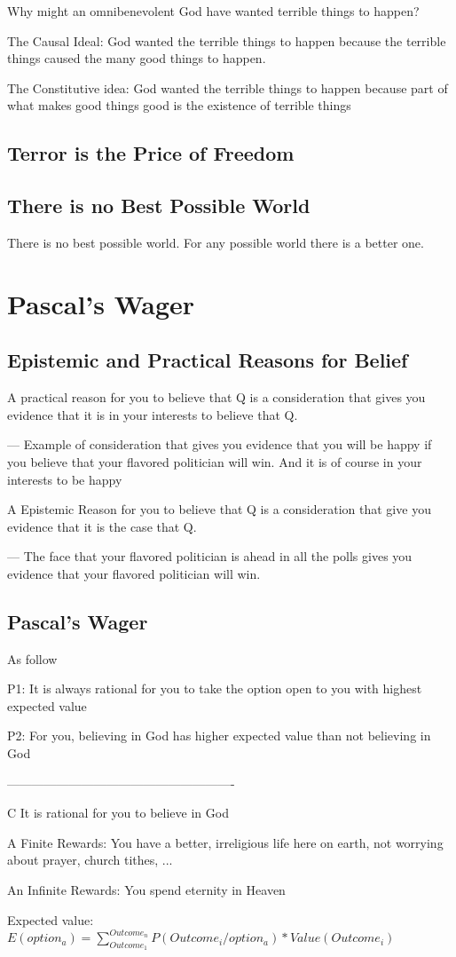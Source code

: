 \documentclass{article}
\begin{document}
Why might an omnibenevolent God have wanted terrible things to happen?

The Causal Ideal: God wanted the terrible things to happen because the terrible things caused the many good things to happen.

The Constitutive idea: God wanted the terrible things to happen because part of what makes good things good is the existence of terrible things

\subsection{Terror is the Price of Freedom}

\subsection{There is no Best Possible World}

There is no best possible world. For any possible world there is a better one.

\section{Pascal's Wager}
\subsection{Epistemic and Practical Reasons for Belief}

A practical reason for you to believe that Q is a consideration that gives you evidence that it is in your interests to believe that Q.

--- Example of consideration that gives you evidence that you will be happy if you believe that your flavored politician will win. And it is of course in your interests to be happy

A Epistemic Reason for you to believe that Q is a consideration that give you evidence that it is the case that Q.

--- The face that your flavored politician is ahead in all the polls gives you evidence that your flavored politician will win.

\subsection{Pascal's Wager}

As follow

P1: It is always rational for you to take the option open to you with highest expected value

P2: For you, believing in God has higher expected value than not believing in God

-------------------------------------------------------

C It is rational for you to believe in God


A Finite Rewards: You have a better, irreligious life here on earth, not worrying about prayer, church tithes, ...

An Infinite Rewards: You spend eternity in Heaven


Expected value: $E(option_a) = \sum_{Outcome_1}^{Outcome_n} P (Outcome_i/ option_a)* Value(Outcome_i)$
\end{document}
